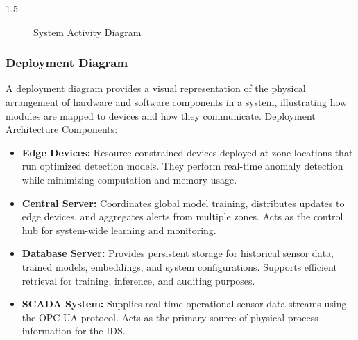 \begin{spacing}{1.5}
\begin{figure}[H]
\caption{System Activity Diagram}
\end{figure}





\subsubsection{Deployment Diagram}

A deployment diagram provides a visual representation of the physical arrangement of hardware and software components in a system, illustrating how modules are mapped to devices and how they communicate. Deployment Architecture Components:

\begin{itemize}
    \item \textbf{Edge Devices:}  
    Resource-constrained devices deployed at zone locations that run optimized detection models. They perform real-time anomaly detection while minimizing computation and memory usage.

    \item \textbf{Central Server:}  
    Coordinates global model training, distributes updates to edge devices, and aggregates alerts from multiple zones. Acts as the control hub for system-wide learning and monitoring.

    \item \textbf{Database Server:}  
    Provides persistent storage for historical sensor data, trained models, embeddings, and system configurations. Supports efficient retrieval for training, inference, and auditing purposes.

    \item \textbf{SCADA System:}  
    Supplies real-time operational sensor data streams using the OPC-UA protocol. Acts as the primary source of physical process information for the IDS.
\end{itemize}


\end{spacing}

